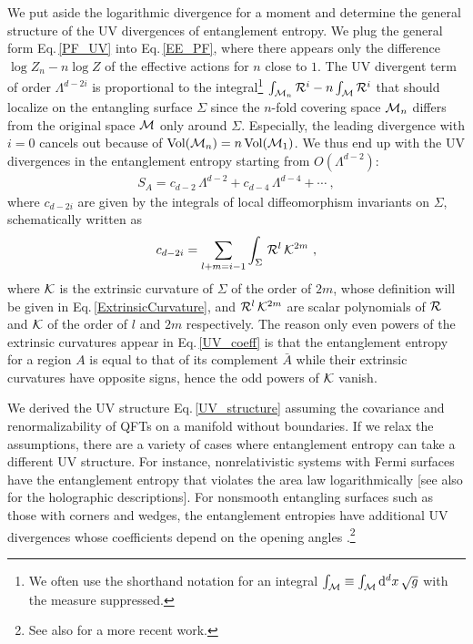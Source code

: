 We put aside the logarithmic divergence for a moment and determine the general structure of the UV divergences of entanglement entropy.
We plug the general form Eq.\,\eqref{PF_UV} into Eq.\,\eqref{EE_PF}, where there appears only the difference $\log Z_n - n\log Z$ of the effective actions for $n$ close to $1$.
The UV divergent term of order $\Lambda^{d-2i}$ is proportional to the integral\footnote{We often use the shorthand notation for an integral $\int_{{\cal M}} \equiv \int_{{\cal M}} \mathrm{d}^d x\,\sqrt{g}$ with the measure suppressed.} $\int_{{\cal M}_n}{\cal R}^i - n \int_{{\cal M}}{\cal R}^i$ that should localize on the entangling surface $\Sigma$ since the $n$-fold covering space ${\cal M}_n$ differs from the original space ${\cal M}$ only around $\Sigma$.
Especially, the leading divergence with $i=0$ cancels out because of $\text{Vol}({\cal M}_n) = n\, \text{Vol} ({\cal M}_1)$.
We thus end up with the UV divergences in the entanglement entropy starting from $O(\Lambda^{d-2})$:
\begin{align}\label{UV_structure}
S_A = c_{d-2}\,\Lambda^{d-2} + c_{d-4}\, \Lambda^{d-4} + \cdots \ ,
\end{align}
where $c_{d-2i}$ are given by the integrals of local diffeomorphism invariants on $\Sigma$, schematically written as
\begin{align}\label{UV_coeff}
	c_{d-2i} = \sum_{l+m=i-1}\int_\Sigma \, {\cal R}^l\, {\cal K}^{2m} \ ,
\end{align}
where ${\cal K}$ is the extrinsic curvature of $\Sigma$ of the order of $2m$, whose definition will be given in Eq.\,\eqref{ExtrinsicCurvature},
and ${\cal R}^l\, {\cal K}^{2m}$ are scalar polynomials of ${\cal R}$ and ${\cal K}$ of the order of $l$ and $2m$ respectively.
The reason only even powers of the extrinsic curvatures appear in Eq.\,\eqref{UV_coeff} is that the entanglement entropy for a region $A$ is equal to that of its complement $\bar A$ while their extrinsic curvatures have opposite signs, hence the odd powers of ${\cal K}$ vanish.

We derived the UV structure Eq.\,\eqref{UV_structure} assuming the covariance and renormalizability of QFTs on a manifold without boundaries.
If we relax the assumptions, there are a variety of cases where entanglement entropy can take a different UV structure.
For instance, nonrelativistic systems with Fermi surfaces have the entanglement entropy that violates the area law logarithmically \cite{Wolf:2006zzb,Gioev:2006zz} [see also \textcite{Ogawa:2011bz,Huijse:2011ef} for the holographic descriptions].
For nonsmooth entangling surfaces such as those with corners and wedges, the entanglement entropies have additional UV divergences whose coefficients depend on the opening angles \cite{Fradkin:2006mb,Casini:2006hu,Hirata:2006jx,Casini:2008as,Bueno:2015xda,Bueno:2015rda,Elvang:2015jpa,Klebanov:2012yf,Myers:2012vs}.\footnote{See also \textcite{Ghasemi:2017pke} for a more recent work.}


